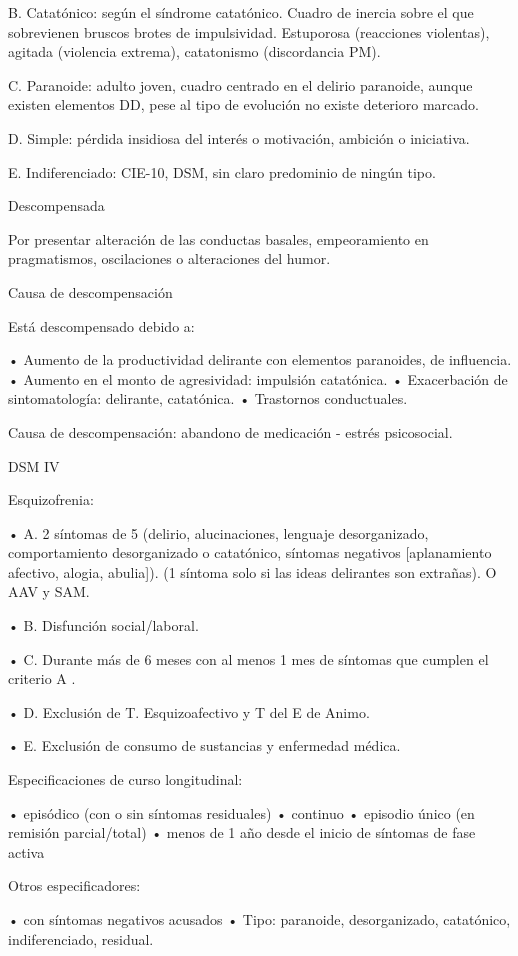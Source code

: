 \documentclass{scrbook}
\begin{document}
B. Catatónico: según el síndrome catatónico. Cuadro de inercia sobre el que sobrevienen bruscos brotes de impulsividad. Estuporosa (reacciones violentas), agitada (violencia extrema), catatonismo (discordancia PM).

C. Paranoide: adulto joven, cuadro centrado en el delirio paranoide, aunque existen elementos DD, pese al tipo de evolución no existe deterioro marcado.

D. Simple: pérdida insidiosa del interés o motivación, ambición o iniciativa.

E. Indiferenciado: CIE-10, DSM, sin claro predominio de ningún tipo.

Descompensada

Por presentar alteración de las conductas basales, empeoramiento en pragmatismos, oscilaciones o alteraciones del humor.

Causa de descompensación

Está descompensado debido a:

• Aumento de la productividad delirante con elementos paranoides, de influencia.
• Aumento en el monto de agresividad: impulsión catatónica.
• Exacerbación de sintomatología: delirante, catatónica.
• Trastornos conductuales.

Causa de descompensación: abandono de medicación - estrés psicosocial.

DSM IV

Esquizofrenia:

• A. 2 síntomas de 5 (delirio, alucinaciones, lenguaje desorganizado, comportamiento desorganizado o catatónico, síntomas negativos [aplanamiento afectivo, alogia, abulia]). (1 síntoma solo si las ideas delirantes son extrañas). O AAV y SAM.

• B. Disfunción social/laboral.

• C. Durante más de 6 meses con al menos 1 mes de síntomas que cumplen el criterio A .

• D. Exclusión de T. Esquizoafectivo y T del E de Animo.

• E. Exclusión de consumo de sustancias y enfermedad médica.

Especificaciones de curso longitudinal:

• episódico (con o sin síntomas residuales)
• continuo
• episodio único (en remisión parcial/total)
• menos de 1 año desde el inicio de síntomas de fase activa

Otros especificadores:

• con síntomas negativos acusados
• Tipo: paranoide, desorganizado, catatónico, indiferenciado, residual.
\end{document}
